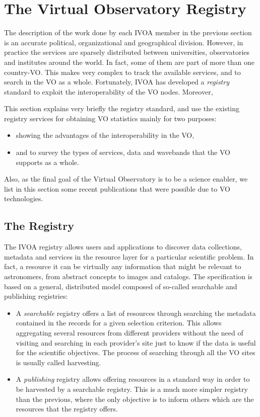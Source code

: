 \section{The Virtual Observatory Registry}
\label{sec:registry}

The description of the work done by each IVOA member
in the previous section is an accurate political, organizational 
and geographical division. However, in practice the services
are sparsely distributed between universities, observatories
and institutes around the world. In fact, some of them 
are part of more than one country-VO. 
This makes very complex to track the available services, 
and to search in the VO as a whole. Fortunately, 
IVOA has developed a \emph{registry} standard to 
exploit the interoperability of the VO nodes.
Moreover, 

This section explains very briefly the registry standard,
and use the existing registry services for obtaining VO 
statistics mainly for two purposes:
\begin{itemize}
\item showing the advantages of the interoperability in the VO,
\item and to survey the types of services, data and wavebands that
the VO supports as a whole.
\end{itemize}
Also, as the final goal of the Virtual Observatory is to be a science enabler,
we list in this section some recent publications that were possible due to
VO technologies.

\subsection{The Registry}

The IVOA registry allows users and applications to discover data collections,
metadata and services in the resource layer for a particular scientific
problem. In fact, a resource it can be virtually any information that might be
relevant to astronomers, from abstract concepts to images and catalogs. 
The specification is based on a general, distributed model composed of
so-called searchable and publishing registries:
\begin{itemize}
\item A \emph{searchable} registry offers a list of resources through searching the 
metadata contained in the records for a given selection criterion.
This allows aggregating several resources from different providers 
without the need of visiting and searching in each provider's site just to
know if the data is useful for the scientific objectives.
The process of searching through all the VO sites is usually called harvesting.
\item A \emph{publishing} registry allows offering resources in a standard way
in order to be harvested by a searchable registry. This is a much more
simpler registry than the previous, where the only objective is to 
inform others which are the resources that the registry offers.
\end{itemize}

